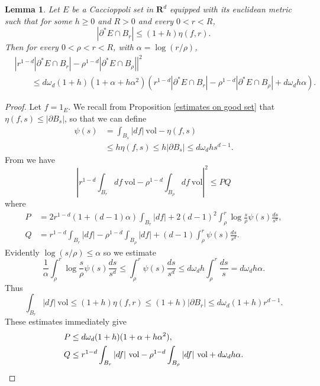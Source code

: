 \documentclass[reqno,12pt,letterpaper]{amsart}
\newcommand{\RR}{\mathbf{R}}
\newcommand{\vol}{\mathrm{vol}}
\newtheorem{lemma}[theorem]{Lemma}
\theoremstyle{definition}
\numberwithin{equation}{section}
\begin{document}
\begin{lemma}\label{approximate monotonicity}
Let $E$ be a Caccioppoli set in $\RR^d$ equipped with its euclidean metric such that for some $h \geq 0$ and $R > 0$ and every $0 < r < R$,
$$|\partial^* E \cap B_r| \leq (1 + h)\eta(f, r).$$
Then for every $0 < \rho < r < R$, with $\alpha = \log(r/\rho)$,
\begin{align*}
&\left|r^{1 - d} |\partial^* E \cap B_r| - \rho^{1 - d} |\partial^* E \cap B_\rho|\right|^2 \\
&\qquad \leq d\omega_d(1 + h)(1 + \alpha + h\alpha^2) \left(r^{1 - d} |\partial^* E \cap B_r| - \rho^{1 - d} |\partial^* E \cap B_\rho| + d\omega_d h \alpha\right).
\end{align*}
\end{lemma}
\begin{proof}
Let $f = 1_E$.
We recall from Proposition \ref{estimates on good set} that $\eta(f, s) \leq |\partial B_s|$, so that we can define
\begin{align*}
\psi(s) &= \int_{B_s} |df|~\vol - \eta(f, s)\\
&\leq h\eta(f, s) \leq h|\partial B_s| \leq d\omega_d hs^{d - 1}.
\end{align*}
From \cite[Proposition 5.12]{Giusti77} we have
$$\left|r^{1 - d} \int_{B_r} df ~\vol - \rho^{1 - d} \int_{B_\rho} df ~\vol\right|^2 \leq PQ$$
where
\begin{align*}
P &= 2r^{1 - d}(1 + (d - 1)\alpha) \int_{B_r} |df| + 2(d - 1)^2 \int_\rho^r \log \frac{s}{\rho} \psi(s) \frac{ds}{s^d},\\
Q &= r^{1 - d} \int_{B_r} |df| - \rho^{1 - d} \int_{B_\rho} |df| + (d - 1)\int_\rho^r \psi(s) \frac{ds}{s^d}.
\end{align*}
Evidently $\log(s/\rho) \leq \alpha$ so we estimate
$$\frac{1}{\alpha} \int_\rho^r \log \frac{s}{\rho} \psi(s) \frac{ds}{s^d} \leq \int_\rho^r \psi(s) \frac{ds}{s^d} \leq d\omega_d h \int_\rho^r \frac{ds}{s} = d\omega_d h\alpha.$$
Thus
$$\int_{B_r} |df|~\vol \leq (1 + h)\eta(f, r) \leq (1 + h)|\partial B_r| \leq d\omega_d(1 + h) r^{d - 1}.$$
These estimates immediately give
\begin{align*}
P &\leq d\omega_d(1 + h)(1 + \alpha + h\alpha^2),\\
Q &\leq r^{1 - d} \int_{B_r} |df|~\vol - \rho^{1 - d} \int_{B_\rho} |df|~\vol + d\omega_d h\alpha. \qedhere
\end{align*}
\end{proof}
\end{document}

